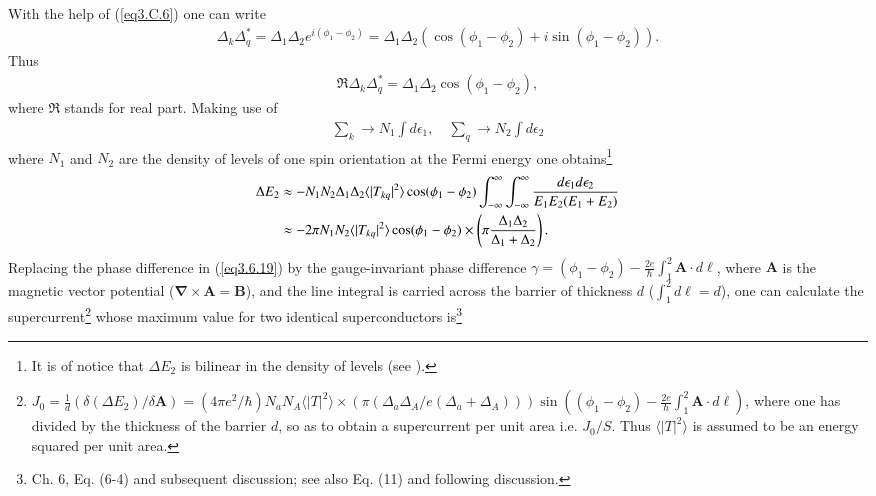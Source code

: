 With the help of (\ref{eq3.C.6}) one can write
\begin{align}
\Delta_k\Delta_q^*=\Delta_1\Delta_2e^{i(\phi_1-\phi_2)}=\Delta_1\Delta_2\left(\cos(\phi_1-\phi_2)+i\sin(\phi_1-\phi_2)\right).
\end{align}
Thus
\begin{align}
\Re\Delta_k\Delta_q^*=\Delta_1\Delta_2\cos(\phi_1-\phi_2),
\end{align}
where $\Re$ stands for real part. Making use of
\begin{align}
\sum_k\rightarrow N_1\int d\epsilon_1,\quad\sum_q\rightarrow N_2\int d\epsilon_2
\end{align}
where $N_1$ and $N_2$ are the density of levels of one spin orientation at the Fermi energy one  obtains\footnote{It is of notice that $\Delta E_2$ is bilinear in the density of levels (see \cite{Potel:17}).}
\begin{align}\label{eq3.6.19}
\nonumber\Delta E_2&\approx-N_1N_2\Delta_1 \Delta_2 \langle|T_{kq}|^2\rangle \cos(\phi_1-\phi_2)\int_{-\infty}^{\infty}\int_{-\infty}^{\infty}\frac{d\epsilon_1 d\epsilon_2}{E_1 E_2(E_1+E_2)}\\
&\approx -2\pi N_1 N_2 \langle|T_{kq}|^2\rangle \cos(\phi_1-\phi_2)\times \left(\pi\frac{\Delta_1\Delta_2}{\Delta_1+\Delta_2}\right). \idx{Josephson effect!reduced pairing gap} \idx{Weak link between superconductors!tunneling interaction (second order)}
\end{align}
Replacing the phase difference in (\ref{eq3.6.19}) by the gauge-invariant phase difference $\gamma=(\phi_1-\phi_2)-\frac{2e}{\hbar}\int_1^2\mathbf A\cdot d\pmb \ell$, where $\mathbf A$ is the magnetic vector potential ($\pmb\nabla\times\mathbf A=\mathbf B$), and the line integral is carried across the barrier of thickness $d$ ($\int_1^2d\ell=d$), one can calculate the supercurrent\footnote{
	\label{f57C4} $J_0=\frac{1}{d}\left(\delta(\Delta E_2)/\delta\mathbf A\right)=\left(4\pi  e^2/\hbar\right)N_aN_A\langle|T|^2\rangle\times\left( \pi(\Delta_a\Delta_A/e(\Delta_a+\Delta_A))\right)\sin\left((\phi_1-\phi_2)-\frac{2e}{\hbar}\int_1^2\mathbf A\cdot d\pmb \ell\right)$, where one has divided by the thickness of the barrier $d$, so as to obtain a supercurrent per unit area i.e. $J_0/S$. Thus $\langle|T|^2\rangle$ is assumed to be an energy squared per unit area.} whose maximum value for two identical superconductors is\footnote{\cite{Tinkham:96} Ch. 6, Eq. (6-4) and subsequent discussion; see also \cite{Anderson:64} Eq. (11) and following discussion.}
